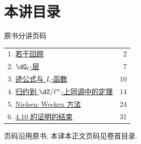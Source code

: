 \section*{本讲目录}
\begingroup\small
\noindent\hfill 原书分讲页码\par\smallskip
\begin{tabular}{@{}p{.87\linewidth}r@{}}
1. \hyperref[II:1]{若干回顾} & 2\\
2. \hyperref[II:2]{$\dQ_\ell$-层} & 7\\
3. \hyperref[II:3]{迹公式与 $L$-函数} & 10\\
4. \hyperref[II:4]{归约到 $\dZ/\ell^n$-上同调中的定理} & 14\\
5. \hyperref[II:5]{Nielsen--Wecken 方法} & 24\\
6. \hyperref[II:6]{4.10 的证明的结束} & 31
\end{tabular}
\par\medskip
\noindent 页码沿用原书; 本译本正文页码见卷首目录.
\endgroup
\clearpage
